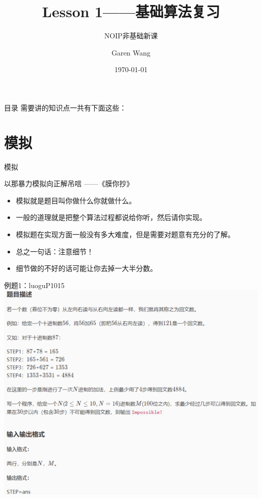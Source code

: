 \documentclass{beamer}[UTF-8]
\title{Lesson 1——基础算法复习}
\subtitle{NOIP非基础新课}
\author{Garen Wang}
\date{\today}
\begin{document}
\maketitle

\begin{frame}{目录}
需要讲的知识点一共有下面这些： \pause
\tableofcontents
\end{frame}

\section{模拟} %
\begin{frame}{模拟}
\begin{center} 以那暴力模拟向正解吊唁 ——《膜你抄》 \end{center}

\begin{itemize}
\item 模拟就是题目叫你做什么你就做什么。  \pause
\item 一般的道理就是把整个算法过程都说给你听，然后请你实现。   \pause
\item 模拟题在实现方面一般没有多大难度，但是需要对题意有充分的了解。  \pause
\item 总之一句话：注意细节！  \pause
\item 细节做的不好的话可能让你去掉一大半分数。
\end{itemize}

\end{frame}

\begin{frame}{例题1：luoguP1015}
\includegraphics[width=\textwidth, height=\textheight]{luoguP1015.png}
\end{frame}
\end{document}
